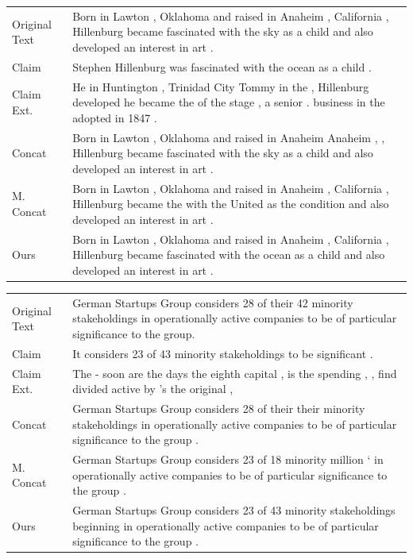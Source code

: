 \documentclass[letterpaper]{article} %
\begin{document}
\begin{table}[t]
  \small
  \centering
  
  \begin{tabular}{p{3cm}|p{11cm}}
    \toprule
      Original Text & Born in Lawton , Oklahoma and raised in Anaheim , California , Hillenburg became fascinated with the sky as a child and also developed an interest in art . \\
      Claim & Stephen Hillenburg was fascinated with the ocean as a child .\\
    \midrule
      Claim Ext. & He in Huntington , Trinidad City Tommy in the , Hillenburg developed he became the of the stage , a senior . business in the adopted in 1847 .\\
      Concat & Born in Lawton , Oklahoma and raised in Anaheim Anaheim , , Hillenburg became fascinated with the sky as a child and also developed an interest in art . \\
      M. Concat   &  Born in Lawton , Oklahoma and raised in Anaheim , California , Hillenburg became the with the United as the condition and also developed an interest in art . \\
      Ours  & Born in Lawton , Oklahoma and raised in Anaheim , California , Hillenburg became fascinated with the ocean as a child and also developed an interest in art .
  \end{tabular}
  \begin{tabular}{p{3cm}|p{11cm}}
    \toprule
      Original Text & German Startups Group considers 28 of their 42 minority stakeholdings in operationally active companies to be of particular significance to the group. \\
      Claim & It considers 23 of 43 minority stakeholdings to be significant .\\
    \midrule
      Claim Ext. & The - soon are the days the eighth capital , is the spending , , find divided active by 's the original ,\\
      Concat & German Startups Group considers 28 of their their minority stakeholdings in operationally active companies to be of particular significance to the  group . \\
      M. Concat   &  German Startups Group considers 23 of 18 minority million ` in operationally active companies to be of particular significance to the group . \\
      Ours  & German Startups Group considers 23 of 43 minority stakeholdings beginning in operationally active companies to be of particular significance to the   group .

\end{tabular}
\end{table}
\end{document}
